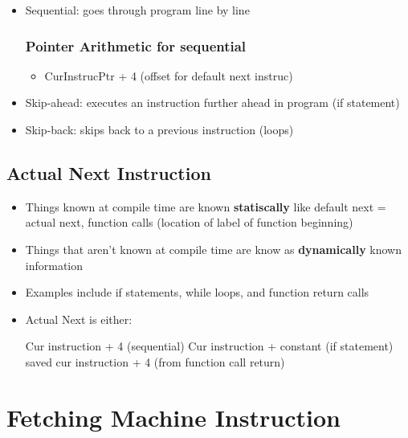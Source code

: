 \documentclass{article}
\begin{document}
    \begin{itemize}
        \item Sequential: goes through program line by line
        
        \subsubsection{Pointer Arithmetic for sequential}
        
        \begin{itemize}
            \item CurInstrucPtr + 4 (offset for default next instruc)
        \end{itemize}
            
        
        \item Skip-ahead: executes an instruction further ahead in program (if statement)
        
        \item Skip-back: skips back to a previous instruction (loops)
    \end{itemize}
 
 \subsection{Actual Next Instruction}
 
 \begin{itemize}
     \item Things known at compile time are known \textbf{statiscally} like default next = actual next, function calls (location of label of function beginning)
     
     \item Things that aren't known at compile time are know as \textbf{dynamically} known information
     
     \item Examples include if statements, while loops, and function return calls
     
     \item Actual Next is either:
     
     Cur instruction + 4 (sequential)
     Cur instruction + constant (if statement)
     saved cur instruction + 4 (from function call return)
     
 \end{itemize}
 
 \section{Fetching Machine Instruction}
 
\end{document}
